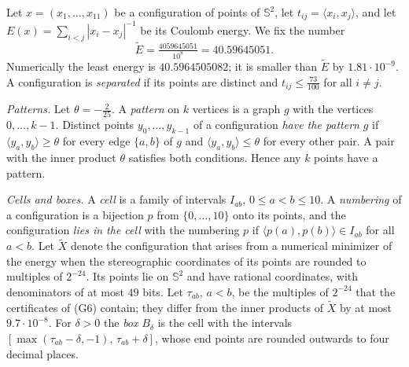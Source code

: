 \documentclass[reqno,a4paper,11pt]{amsart}
\numberwithin{equation}{section}
\newcommand{\Sph}{\mathbb{S}}
\newcommand{\factNrgDataCentre}{9.7 \cdot 10^{-8}}
\newcommand{\factNrgDataTargetVsSource}{1.81 \cdot 10^{-9}}
\newcommand{\factNrgUpperBits}{49}
\begin{document}
Let $x = (x_1, \dots, x_{11})$ be a configuration of points of $\Sph^2$, let $t_{ij} = \langle x_i, x_j \rangle$, and let $E(x) = \sum_{i<j} |x_i - x_j|^{-1}$ be its Coulomb energy. We fix the number
$$
\tilde E = \tfrac{4059645051}{10^8} = 40.59645051 .
$$
Numerically the least energy is $40.5964505082$; it is smaller than $\tilde E$ by $\factNrgDataTargetVsSource$. A configuration is \emph{separated} if its points are distinct and $t_{ij} \leq \tfrac{73}{100}$ for all $i \neq j$.

\emph{Patterns.} Let $\theta = -\tfrac{2}{25}$. A \emph{pattern} on $k$ vertices is a graph $g$ with the vertices $0, \dots, k-1$. Distinct points $y_0, \dots, y_{k-1}$ of a configuration \emph{have the pattern} $g$ if $\langle y_a, y_b \rangle \geq \theta$ for every edge $\{a,b\}$ of $g$ and $\langle y_a, y_b \rangle \leq \theta$ for every other pair. A pair with the inner product $\theta$ satisfies both conditions. Hence any $k$ points have a pattern.

\emph{Cells and boxes.} A \emph{cell} is a family of intervals $I_{ab}$, $0 \leq a < b \leq 10$. A \emph{numbering} of a configuration is a bijection $p$ from $\{0, \dots, 10\}$ onto its points, and the configuration \emph{lies in the cell} with the numbering $p$ if $\langle p(a), p(b) \rangle \in I_{ab}$ for all $a < b$. Let $\tilde X$ denote the configuration that arises from a numerical minimizer of the energy when the stereographic coordinates of its points are rounded to multiples of $2^{-24}$. Its points lie on $\Sph^2$ and have rational coordinates, with denominators of at most $\factNrgUpperBits$ bits. Let $\tau_{ab}$, $a < b$, be the multiples of $2^{-24}$ that the certificates of (G6) contain; they differ from the inner products of $\tilde X$ by at most $\factNrgDataCentre$. For $\delta > 0$ the \emph{box} $B_\delta$ is the cell with the intervals $[\max(\tau_{ab} - \delta, -1), \, \tau_{ab} + \delta]$, whose end points are rounded outwards to four decimal places.
\end{document}
